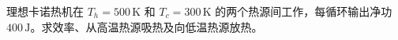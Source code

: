 理想卡诺热机在 $T_h=500\,\mathrm K$ 和 $T_c=300\,\mathrm K$ 的两个热源间工作，每循环输出净功 $400\,\mathrm J$。求效率、从高温热源吸热及向低温热源放热。
